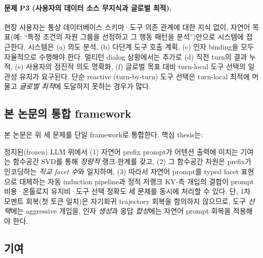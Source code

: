 \documentclass[11pt]{article}
\theoremstyle{definition}
\begin{document}
\paragraph{문제 P3 (사용자의 데이터 소스 무지식과 글로벌 최적).}
현장 사용자는 통상 데이터베이스 스키마·도구 의존 관계에 대한 지식 없이, 자연어 목표(예: ``특정 조건의 자원 그룹을 선정하고 그 행동 패턴을 분석'')만으로 시스템에 접근한다. 시스템은 (a) 의도 분석, (b) 다단계 도구 호출 계획, (c) 인자 binding을 모두 자율적으로 수행해야 한다. 멀티턴 dialog 상황에서는 추가로 (d) 직전 turn의 결과 누적, (e) 사용자의 점진적 의도 명확화, (f) 글로벌 목표 대비 turn-local 도구 선택의 일관성 유지가 요구된다. 단순 reactive (turn-by-turn) 도구 선택은 turn-local 최적에 머물고 \emph{글로벌 최적}에 도달하지 못하는 경우가 많다.

\subsection{본 논문의 통합 framework}

본 논문은 위 세 문제를 단일 framework로 통합한다. 핵심 thesis는:

\begin{tcolorbox}[colback=blue!5!white, colframe=blue!50!black, title=핵심 Thesis]
정지된(frozen) LLM 위에서 (1) 자연어 prefix prompt가 어텐션 출력에 미치는 기여는 함수공간 SVD를 통해 \emph{정량적} 랭크-한계를 갖고, (2) 그 함수공간 차원은 prefix가 인코딩하는 \emph{직교 facet 수}와 일치하며, (3) 따라서 자연어 prompt를 typed facet 표현으로 대체하는 자동 induction pipeline과 정적 저랭크 KV-측 개입의 결합이 prompt 비용·온톨로지 유지비·도구 선택 정확도 세 문제를 동시에 처리할 수 있다. 단, 1차 모멘트 회복(첫 토큰 일치)은 자기회귀 trajectory 회복을 함의하지 않으므로, 도구 \emph{선택}에는 aggressive 개입을, 인자 \emph{생성}과 응답 \emph{합성}에는 자연어 prompt 회복을 적용해야 한다.
\end{tcolorbox}

\subsection{기여}
\label{sec:contrib}
\end{document}

